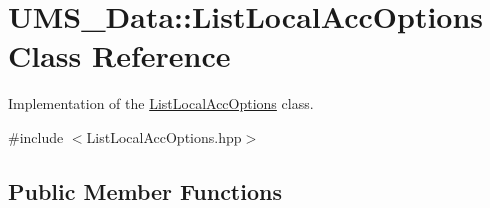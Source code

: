 \hypertarget{classUMS__Data_1_1ListLocalAccOptions}{
\section{UMS\_\-Data::ListLocalAccOptions Class Reference}
\label{classUMS__Data_1_1ListLocalAccOptions}
}


Implementation of the \hyperlink{classUMS__Data_1_1ListLocalAccOptions}{ListLocalAccOptions} class.  




{\ttfamily \#include $<$ListLocalAccOptions.hpp$>$}

\subsection*{Public Member Functions}
